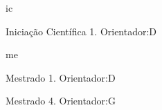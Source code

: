 \begin{comment}
\section{Orientações e supervisões em andamento}
\subsection{Dissertações de mestrado em andamento}
Não inserido
\subsection{Teses de doutorado em andamento}
Não inserido
\subsection{Pós-Doutorados em andamento}
Não inserido

\section{Orientações e supervisões concluídas}
\subsection{Dissertações de mestrado concluídas}
Não inserido
\subsection{Teses de doutorado concluídas}
Não inserido
\subsection{Pós-Doutorados concluídos}
Não inserido
\end{comment}


\begin{orientacao}{ic}
    \item Iniciação Científica 1. Orientador:D
    
\end{orientacao}

\begin{orientacao}{me}
    \item Mestrado 1. Orientador:D
    \item Mestrado 4. Orientador:G
    
\end{orientacao}

